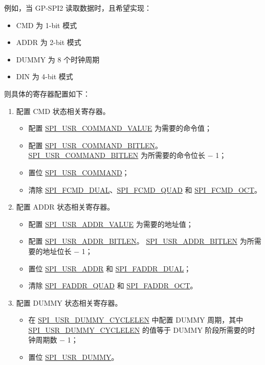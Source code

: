 \documentclass[main\_\_CN.tex]{subfiles}
\begin{document}
例如，当 GP-SPI2 读取数据时，且希望实现： 
\begin{itemize}
    \item CMD 为 1-bit 模式
    \item ADDR 为 2-bit 模式
    \item DUMMY 为 8 个时钟周期
    \item DIN 为 4-bit 模式
\end{itemize}
则具体的寄存器配置如下：
\begin{enumerate}
    \item 配置 CMD 状态相关寄存器。
        \begin{itemize}
            \item 配置 \hyperref[fielddesc:SPIUSRCOMMANDVALUE]{SPI\_USR\_COMMAND\_VALUE} 为需要的命令值；
            \item 配置 \hyperref[fielddesc:SPIUSRCOMMANDBITLEN]{SPI\_USR\_COMMAND\_BITLEN}。\hyperref[fielddesc:SPIUSRCOMMANDBITLEN]{SPI\_USR\_COMMAND\_BITLEN} 为所需要的命令位长 $-$ 1；
            \item 置位 \hyperref[fielddesc:SPIUSRCOMMAND]{SPI\_USR\_COMMAND}；
            \item 清除 \hyperref[fielddesc:SPIFCMDDUAL]{SPI\_FCMD\_DUAL}、\hyperref[fielddesc:SPIFCMDQUAD]{SPI\_FCMD\_QUAD} 和 \hyperref[fielddesc:SPIFCMDOCT]{SPI\_FCMD\_OCT}。
        \end{itemize}
        
    \item 配置 ADDR 状态相关寄存器。
        \begin{itemize}
            \item 配置 \hyperref[fielddesc:SPIUSRADDRVALUE]{SPI\_USR\_ADDR\_VALUE} 为需要的地址值；
            \item 配置 \hyperref[fielddesc:SPIUSRADDRBITLEN]{SPI\_USR\_ADDR\_BITLEN}。 \hyperref[fielddesc:SPIUSRADDRBITLEN]{SPI\_USR\_ADDR\_BITLEN} 为所需要的地址位长 $-$ 1；
            \item 置位 \hyperref[fielddesc:SPIUSRADDR]{SPI\_USR\_ADDR} 和 \hyperref[fielddesc:SPIFADDRDUAL]{SPI\_FADDR\_DUAL}；
            \item 清除 \hyperref[fielddesc:SPIFADDRQUAD]{SPI\_FADDR\_QUAD} 和 \hyperref[fielddesc:SPIFADDROCT]{SPI\_FADDR\_OCT}。
        \end{itemize}
        
    \item 配置 DUMMY 状态相关寄存器。
        \begin{itemize}
            \item 在 \hyperref[fielddesc:SPIUSRDUMMYCYCLELEN]{SPI\_USR\_DUMMY\_CYCLELEN} 中配置 DUMMY 周期，其中 \hyperref[fielddesc:SPIUSRDUMMYCYCLELEN]{SPI\_USR\_DUMMY\_CYCLELEN} 的值等于 DUMMY 阶段所需要的时钟周期数 $-$ 1；
            \item 置位 \hyperref[fielddesc:SPIUSRDUMMY]{SPI\_USR\_DUMMY}。
        \end{itemize}        
        

\end{enumerate}
\end{document}
